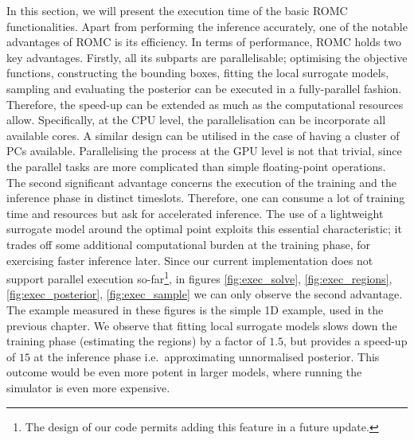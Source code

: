 In this section, we will present the execution time of the basic ROMC
functionalities. Apart from performing the inference accurately, one
of the notable advantages of ROMC is its efficiency. In terms of
performance, ROMC holds two key advantages. Firstly, all its subparts
are parallelisable; optimising the objective functions, constructing
the bounding boxes, fitting the local surrogate models, sampling and
evaluating the posterior can be executed in a fully-parallel
fashion. Therefore, the speed-up can be extended as much as the
computational resources allow. Specifically, at the CPU level, the
parallelisation can be incorporate all available cores. A similar
design can be utilised in the case of having a cluster of PCs
available. Parallelising the process at the GPU level is not that
trivial, since the parallel tasks are more complicated than simple
floating-point operations. The second significant advantage concerns
the execution of the training and the inference phase in distinct
timeslots. Therefore, one can consume a lot of training time and
resources but ask for accelerated inference. The use of a lightweight
surrogate model around the optimal point exploits this essential
characteristic; it trades off some additional computational burden at
the training phase, for exercising faster inference later. Since our
current implementation does not support parallel execution
so-far\footnote{The design of our code permits adding this feature in
  a future update.}, in figures \ref{fig:exec_solve},
\ref{fig:exec_regions}, \ref{fig:exec_posterior},
\ref{fig:exec_sample} we can only observe the second advantage. The
example measured in these figures is the simple 1D example, used in
the previous chapter. We observe that fitting local surrogate models
slows down the training phase (estimating the regions) by a factor of
$1.5$, but provides a speed-up of $15$ at the inference phase
i.e.\ approximating unnormalised posterior. This outcome would be
even more potent in larger models, where running the simulator is even
more expensive.


